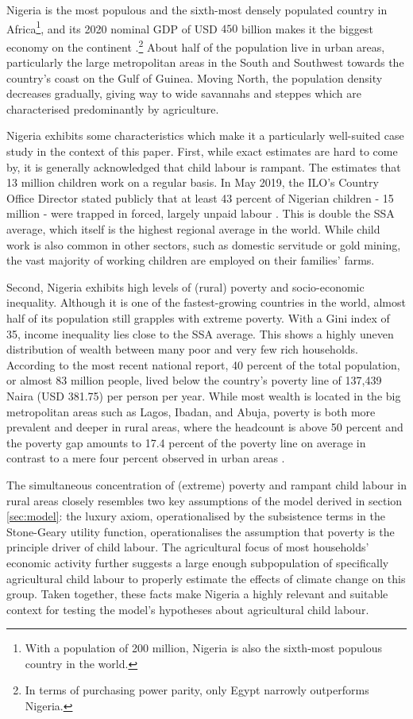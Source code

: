 \documentclass[a4paper,12pt]{article}
\theoremstyle{plain}
\theoremstyle{definition}
\theoremstyle{definition}
\theoremstyle{definition}
\theoremstyle{definition}
\begin{document}
Nigeria is the most populous and the sixth-most densely populated country in Africa\footnote{With a population of 200 million, Nigeria is also the sixth-most populous country in the world.}, and its 2020 nominal GDP of USD $450$ billion makes it the biggest economy on the continent \citep{WorldBank2021}.\footnote{In terms of purchasing power parity, only Egypt narrowly outperforms Nigeria.} About half of the population live in urban areas, particularly the large metropolitan areas in the South and Southwest towards the country's coast on the Gulf of Guinea. Moving North, the population density decreases gradually, giving way to wide savannahs and steppes which are characterised predominantly by agriculture.

Nigeria exhibits some characteristics which make it a particularly well-suited case study in the context of this paper. First, while exact estimates are hard to come by, it is generally acknowledged that child labour is rampant. The \citet{USDepartmentofLabor2021} estimates that 13 million children work on a regular basis. In May 2019, the ILO's Country Office Director stated publicly that at least 43 percent of Nigerian children - 15 million - were trapped in forced, largely unpaid labour \citep{ILO2019}. This is double the SSA average, which itself is the highest regional average in the world. While child work is also common in other sectors, such as domestic servitude or gold mining, the vast majority of working children are employed on their families' farms.

Second, Nigeria exhibits high levels of (rural) poverty and socio-economic inequality. Although it is one of the fastest-growing countries in the world, almost half of its population still grapples with extreme poverty. With a Gini index of 35, income inequality lies close to the SSA average. This shows a highly uneven distribution of wealth between many poor and very few rich households. According to the most recent national report, 40 percent of the total population, or almost 83 million people, lived below the country's poverty line of 137,439 Naira (USD 381.75) per person per year. While most wealth is located in the big metropolitan areas such as Lagos, Ibadan, and Abuja, poverty is both more prevalent and deeper in rural areas, where the headcount is above 50 percent and the poverty gap amounts to 17.4 percent of the poverty line on average in contrast to a mere four percent observed in urban areas \citep{NBS2020}.

The simultaneous concentration of (extreme) poverty and rampant child labour in rural areas closely resembles two key assumptions of the model derived in section \ref{sec:model}: the luxury axiom, operationalised by the subsistence terms in the Stone-Geary utility function, operationalises the assumption that poverty is the principle driver of child labour. The agricultural focus of most households' economic activity further suggests a large enough subpopulation of specifically agricultural child labour to properly estimate the effects of climate change on this group. Taken together, these facts make Nigeria a highly relevant and suitable context for testing the model's hypotheses about agricultural child labour.
\end{document}
